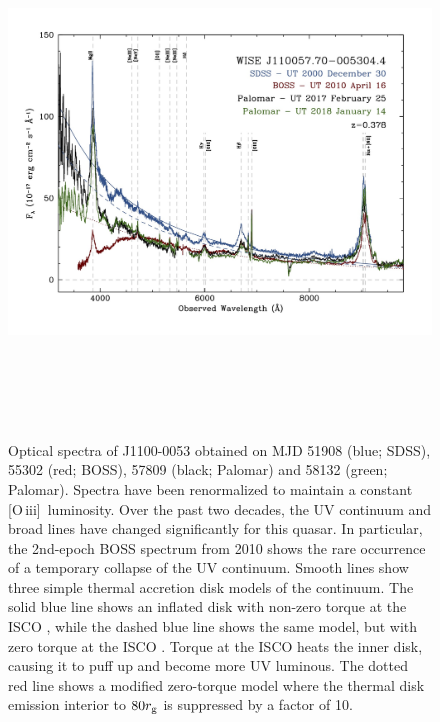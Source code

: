 \documentclass{nature}
\newcommand{\oiii}{[O\,{\sc iii}]\ }
\begin{document}
\begin{figure}
  \centering
  \includegraphics[width=17.00cm, height=14.00cm, trim=0.0cm 0.0cm 0.0cm 0.0cm, clip]
  {../plots/spectra/w1100m0053_sdss_palomar2.jpg}
  \caption[]{Optical spectra of J1100-0053 obtained on MJD 51908 (blue; SDSS), 55302 (red; BOSS), 57809 (black; Palomar) and 58132 (green; Palomar). Spectra have been renormalized to maintain a constant \oiii luminosity. Over the past two decades, the UV continuum and broad lines have changed significantly for this quasar.  In particular, the 2nd-epoch BOSS spectrum from 2010 shows the rare occurrence of a temporary collapse of the UV continuum.  Smooth lines show three simple thermal accretion disk models of the continuum.  The solid blue line shows an inflated disk with non-zero torque at the ISCO \cite[e.g.,][]{Sirko_Goodman2003}, while the dashed blue line shows the same model, but with zero torque at the ISCO \cite[i.e., a simple $\alpha$-disk model,][]{SS73}.  Torque at the ISCO heats the inner disk, causing it to puff up and become more UV luminous.  The dotted red line shows a modified zero-torque model where the thermal disk emission interior to $80 r_{\rm g}$ is suppressed by a factor of 10. }
  \label{fig:J110057_spectra}
\end{figure}
\end{document}
